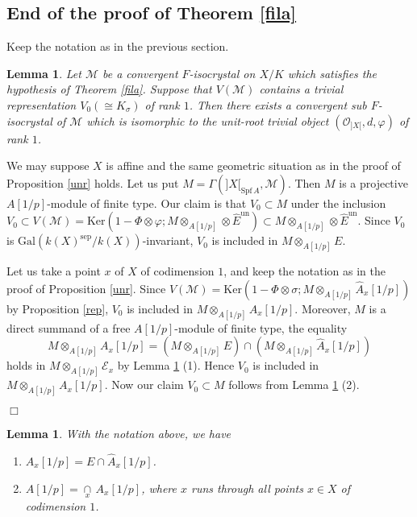 \documentclass[11pt]{amsart}
\newtheorem{lemma}[Lemma]{Lemma}
\begin{document}
\subsection{End of the proof of Theorem \ref{fila}} 
Keep the notation as in the previous section. 

\begin{lemma}\label{unitsub} 
Let $\mathcal M$ be a convergent $F$-isocrystal on $X/K$ which satisfies the hypothesis of Theorem \ref{fila}. 
Suppose that $V(\mathcal M)$ contains a trivial representation $V_0 (\cong K_\sigma)$ of rank $1$. Then there exists a 
convergent sub $F$-isocrystal of $\mathcal M$ which is isomorphic to 
the unit-root trivial object $(\mathcal O_{]X[}, d, \varphi)$ of rank $1$. 
\end{lemma}

{ {We may suppose $X$ is affine and 
the same geometric situation as in the proof of Proposition \ref{unr} holds. 
Let us put $M = \Gamma(]X[_{\mathrm{Spf}\, A}, \mathcal M)$. Then $M$ is a projective $A[1/p]$-module of finite type. 
Our claim is that 
$V_0 \subset M$ under the inclusion $V_0 \subset V(\mathcal M) 
= \mathrm{Ker}(1-\Phi\otimes\varphi; M \otimes_{A[1/p]}\otimes \widehat{E}^{\mathrm{un}}) \subset 
M \otimes_{A[1/p]}\otimes \widehat{E}^{\mathrm{un}}$. 
Since $V_0$ is 
$\mathrm{Gal}(k(X)^{\mathrm{sep}}/k(X))$-invariant, 
$V_0$ is included in $M \otimes_{A[1/p]} E$. 

Let us take a point $x$ of $X$ of codimension $1$, and keep the notation as in the proof of Proposition \ref{unr}. 
Since $V(\mathcal M) =\mathrm{Ker}(1 - \Phi\otimes\sigma; M \otimes_{A[1/p]} \widehat{A}_x[1/p])$ 
by Proposition \ref{rep}, 
$V_0$ is included in $M \otimes_{A[1/p]} \widehat{A}_x[1/p]$. 
Moreover, $M$ is a direct summand of a free $A[1/p]$-module of finite type, the equality 
$$
    M\otimes_{A[1/p]} A_x[1/p] = (M \otimes_{A[1/p]} E) \cap (M \otimes_{A[1/p]} \widehat{A}_x[1/p])
$$
holds in $M \otimes_{A[1/p]} \mathcal E_x$ by Lemma \ref{int} (1). Hence 
$V_0$ is included in $M\otimes_{A[1/p]} A_x[1/p]$. 
Now our claim $V_0 \subset M$ follows from Lemma \ref{int} (2). 
} \hspace*{\fill} $\Box$}

\begin{lemma}\label{int} With the notation above, we have
\begin{enumerate}
\item $A_x[1/p] = E \cap \widehat{A}_x[1/p]$. 
\item $A[1/p] = \underset{x}{\cap}\, A_x[1/p]$, where 
$x$ runs through all points $x \in X$ of codimension $1$.
\end{enumerate}
\end{lemma}
\end{document}
